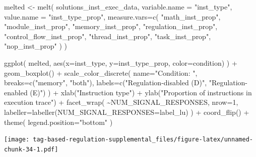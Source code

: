 \documentclass[
]{book}
\newenvironment{Shaded}{\begin{snugshade}}{\end{snugshade}}
\newcommand{\AttributeTok}[1]{\textcolor[rgb]{0.77,0.63,0.00}{#1}}
\newcommand{\DecValTok}[1]{\textcolor[rgb]{0.00,0.00,0.81}{#1}}
\newcommand{\FunctionTok}[1]{\textcolor[rgb]{0.00,0.00,0.00}{#1}}
\newcommand{\NormalTok}[1]{#1}
\newcommand{\OtherTok}[1]{\textcolor[rgb]{0.56,0.35,0.01}{#1}}
\newcommand{\SpecialCharTok}[1]{\textcolor[rgb]{0.00,0.00,0.00}{#1}}
\newcommand{\StringTok}[1]{\textcolor[rgb]{0.31,0.60,0.02}{#1}}
\begin{document}
\begin{Shaded}
\begin{Highlighting}[]
\NormalTok{melted }\OtherTok{\textless{}{-}} \FunctionTok{melt}\NormalTok{(}
\NormalTok{  solutions\_inst\_exec\_data,}
  \AttributeTok{variable.name =} \StringTok{"inst\_type"}\NormalTok{,}
  \AttributeTok{value.name =} \StringTok{"inst\_type\_prop"}\NormalTok{,}
  \AttributeTok{measure.vars=}\FunctionTok{c}\NormalTok{(}
    \StringTok{"math\_inst\_prop"}\NormalTok{,}
    \StringTok{"module\_inst\_prop"}\NormalTok{,}
    \StringTok{"memory\_inst\_prop"}\NormalTok{,}
    \StringTok{"regulation\_inst\_prop"}\NormalTok{,}
    \StringTok{"control\_flow\_inst\_prop"}\NormalTok{,}
    \StringTok{"thread\_inst\_prop"}\NormalTok{,}
    \StringTok{"task\_inst\_prop"}\NormalTok{,}
    \StringTok{"nop\_inst\_prop"}
\NormalTok{  )}
\NormalTok{)}

\FunctionTok{ggplot}\NormalTok{( melted, }\FunctionTok{aes}\NormalTok{(}\AttributeTok{x=}\NormalTok{inst\_type, }\AttributeTok{y=}\NormalTok{inst\_type\_prop, }\AttributeTok{color=}\NormalTok{condition) ) }\SpecialCharTok{+}
  \FunctionTok{geom\_boxplot}\NormalTok{() }\SpecialCharTok{+}
  \FunctionTok{scale\_color\_discrete}\NormalTok{(}
    \AttributeTok{name=}\StringTok{"Condition: "}\NormalTok{,}
    \AttributeTok{breaks=}\FunctionTok{c}\NormalTok{(}\StringTok{"memory"}\NormalTok{, }\StringTok{"both"}\NormalTok{),}
    \AttributeTok{labels=}\FunctionTok{c}\NormalTok{(}\StringTok{"Regulation{-}disabled (D)"}\NormalTok{, }\StringTok{"Regulation{-}enabled (E)"}\NormalTok{)}
\NormalTok{  ) }\SpecialCharTok{+}
  \FunctionTok{xlab}\NormalTok{(}\StringTok{"Instruction type"}\NormalTok{) }\SpecialCharTok{+}
  \FunctionTok{ylab}\NormalTok{(}\StringTok{"Proportion of instructions in execution trace"}\NormalTok{) }\SpecialCharTok{+}
  \FunctionTok{facet\_wrap}\NormalTok{(}
    \SpecialCharTok{\textasciitilde{}}\NormalTok{NUM\_SIGNAL\_RESPONSES,}
    \AttributeTok{nrow=}\DecValTok{1}\NormalTok{,}
    \AttributeTok{labeller=}\FunctionTok{labeller}\NormalTok{(}\AttributeTok{NUM\_SIGNAL\_RESPONSES=}\NormalTok{label\_lu)}
\NormalTok{  ) }\SpecialCharTok{+}
  \FunctionTok{coord\_flip}\NormalTok{() }\SpecialCharTok{+}
  \FunctionTok{theme}\NormalTok{(}
    \AttributeTok{legend.position=}\StringTok{"bottom"}
\NormalTok{  )}
\end{Highlighting}
\end{Shaded}

\texttt{[image: tag-based-regulation-supplemental\_files/figure-latex/unnamed-chunk-34-1.pdf]}
\end{document}
